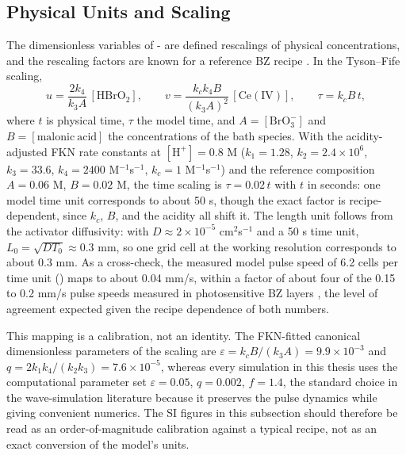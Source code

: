 \subsection{Physical Units and Scaling}
\label{sec:meth_scaling}

The dimensionless variables of - are defined rescalings of physical concentrations, and the rescaling factors are known for a reference BZ recipe \cite{tyson1980target}.
In the Tyson--Fife scaling,
\begin{equation}
u = \frac{2 k_{4}}{k_{3} A}\,[\mathrm{HBrO_{2}}],
\qquad
v = \frac{k_{c} k_{4} B}{(k_{3} A)^{2}}\,[\mathrm{Ce(IV)}],
\qquad
\tau = k_{c} B\,t,
\label{eq:tyson_fife_scaling}
\end{equation}
where $t$ is physical time, $\tau$ the model time, and $A = [\mathrm{BrO_{3}^{-}}]$ and $B = [\mathrm{malonic\ acid}]$ the concentrations of the bath species.
With the acidity-adjusted FKN rate constants at $[\mathrm{H}^{+}] = 0.8$ M ($k_{1} = 1.28$, $k_{2} = 2.4 \times 10^{6}$, $k_{3} = 33.6$, $k_{4} = 2400$ M$^{-1}$s$^{-1}$, $k_{c} = 1$ M$^{-1}$s$^{-1}$) \cite{field1986oxybromine}
and the reference composition $A = 0.06$ M, $B = 0.02$ M, the time scaling is $\tau = 0.02\,t$ with $t$ in seconds: one model time unit corresponds to about 50 s, though the exact factor is recipe-dependent, since $k_{c}$, $B$, and the acidity all shift it.
The length unit follows from the activator diffusivity: with $D \approx 2 \times 10^{-5}$ cm$^{2}$s$^{-1}$ and a 50 s time unit, $L_{0} = \sqrt{D T_{0}} \approx 0.3$ mm, so one grid cell at the working resolution corresponds to about 0.3 mm.
As a cross-check, the measured model pulse speed of 6.2 cells per time unit () maps to about 0.04 mm/s, within a factor of about four of the 0.15 to 0.2 mm/s pulse speeds measured in photosensitive BZ layers \cite{suematsu2021instability}, the level of agreement expected given the recipe dependence of both numbers.

This mapping is a calibration, not an identity.
The FKN-fitted canonical dimensionless parameters of the scaling are $\varepsilon = k_{c} B / (k_{3} A) = 9.9 \times 10^{-3}$ and $q = 2 k_{1} k_{4} / (k_{2} k_{3}) = 7.6 \times 10^{-5}$, whereas every simulation in this thesis uses the computational parameter set $\varepsilon = 0.05$, $q = 0.002$, $f = 1.4$, the standard choice in the wave-simulation literature because it preserves the pulse dynamics while giving convenient numerics.
The SI figures in this subsection should therefore be read as an order-of-magnitude calibration against a typical recipe, not as an exact conversion of the model's units.

